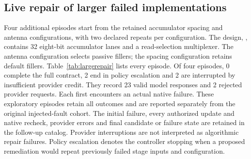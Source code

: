 \subsection{Live repair of larger failed implementations}
Four additional episodes start from the retained accumulator spacing
and antenna configurations, with two declared repeats per configuration.
The design, , contains 32 eight-bit accumulator
lanes and a read-selection multiplexer. The antenna configuration selects
passive fillers; the spacing configuration retains default fillers.
Table~\ref{tab:largerepair} lists every episode.
Of four episodes, 0 complete the full contract, 2 end in policy
escalation and 2 are interrupted by insufficient provider credit.
They record 23 valid model responses and 2 rejected provider
requests. Each first encounters an actual native
failure. These exploratory episodes retain all outcomes and are reported
separately from the original injected-fault cohort. The initial failure,
every authorized update and native recheck, provider errors and final
candidate or failure state are retained in the follow-up catalog.
Provider interruptions are not interpreted as algorithmic repair failures.
Policy escalation denotes the controller stopping when a proposed
remediation would repeat previously failed stage inputs and configuration.

